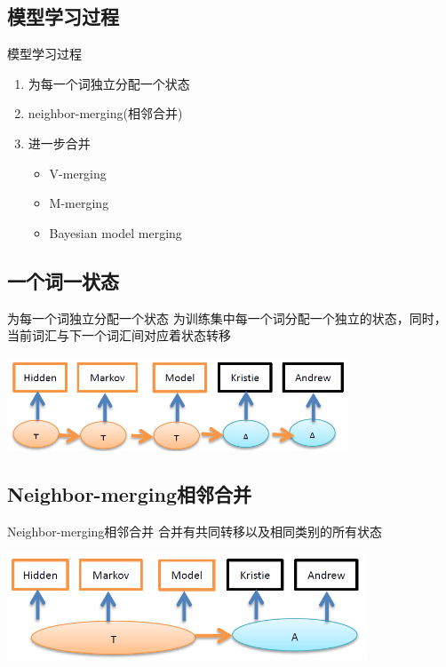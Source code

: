\documentclass{beamer}
\begin{document}
\subsection{模型学习过程}
\begin{frame}{模型学习过程}
    \begin{enumerate}
        \item 为每一个词独立分配一个状态
        \item neighbor-merging(相邻合并)
        \item 进一步合并
            \begin{itemize}
                \item V-merging
                \item M-merging
                \item Bayesian model merging
            \end{itemize}
    \end{enumerate}
\end{frame}

\subsection{一个词一状态}
\begin{frame}{为每一个词独立分配一个状态}
    为训练集中每一个词分配一个独立的状态，同时，当前词汇与下一个词汇间对应着状态转移
    \begin{center}
        \includegraphics[height=80pt]{report5/neighbor-1.png}
    \end{center}
\end{frame}

\subsection{Neighbor-merging相邻合并}
\begin{frame}{Neighbor-merging相邻合并}
    合并有共同转移以及相同类别的所有状态
    \begin{center}
        \includegraphics[height=90pt]{report5/neighbor-2.png}
    \end{center}
\end{frame}
\end{document}

